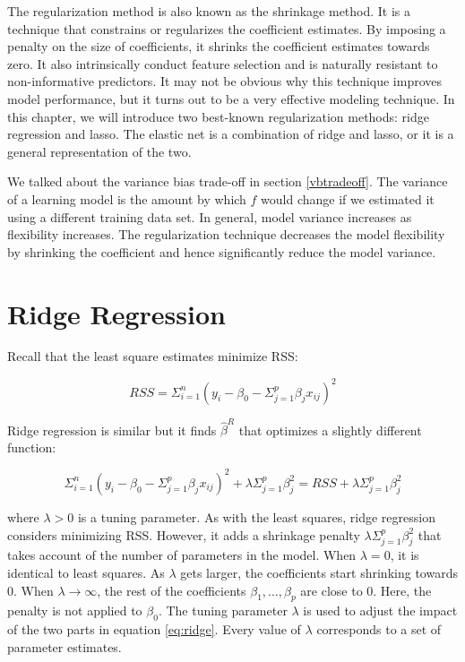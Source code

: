 \documentclass[12pt,]{krantz}
\begin{document}
The regularization method is also known as the shrinkage method. It is a technique that constrains or regularizes the coefficient estimates. By imposing a penalty on the size of coefficients, it shrinks the coefficient estimates towards zero. It also intrinsically conduct feature selection and is naturally resistant to non-informative predictors. It may not be obvious why this technique improves model performance, but it turns out to be a very effective modeling technique. In this chapter, we will introduce two best-known regularization methods: ridge regression and lasso. The elastic net is a combination of ridge and lasso, or it is a general representation of the two.

We talked about the variance bias trade-off in section \ref{vbtradeoff}. The variance of a learning model is the amount by which \(\hat{f}\) would change if we estimated it using a different training data set. In general, model variance increases as flexibility increases. The regularization technique decreases the model flexibility by shrinking the coefficient and hence significantly reduce the model variance.

\hypertarget{ridge-regression}{%
\section{Ridge Regression}\label{ridge-regression}}

Recall that the least square estimates minimize RSS:

\[RSS=\Sigma_{i=1}^{n}(y_{i}-\beta_{0}-\Sigma_{j=1}^{p}\beta_{j}x_{ij})^{2}\]

Ridge regression \citep{Hoerl1970} is similar but it finds \(\hat{\beta}^{R}\) that optimizes a slightly different function:

\begin{equation}
\Sigma_{i=1}^{n}(y_{i}-\beta_{0}-\Sigma_{j=1}^{p}\beta_{j}x_{ij})^{2}+\lambda\Sigma_{j=1}^{p}\beta_{j}^{2}=RSS+\lambda\Sigma_{j=1}^{p}\beta_{j}^{2}
\label{eq:ridge}
\end{equation}

where \(\lambda >0\) is a tuning parameter. As with the least squares, ridge regression considers minimizing RSS. However, it adds a shrinkage penalty \(\lambda\Sigma_{j=1}^{p}\beta_{j}^{2}\) that takes account of the number of parameters in the model. When \(\lambda = 0\), it is identical to least squares. As \(\lambda\) gets larger, the coefficients start shrinking towards 0. When \(\lambda\rightarrow\infty\), the rest of the coefficients \(\beta_{1},...,\beta_{p}\) are close to 0. Here, the penalty is not applied to \(\beta_{0}\). The tuning parameter \(\lambda\) is used to adjust the impact of the two parts in equation \eqref{eq:ridge}. Every value of \(\lambda\) corresponds to a set of parameter estimates.
\end{document}
